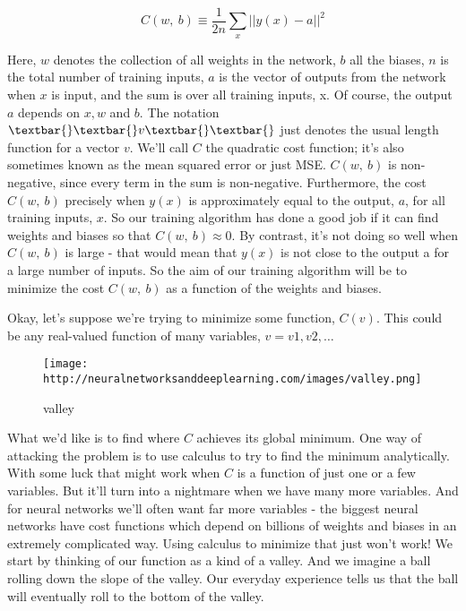 \documentclass[]{article}
\begin{document}
\begin{equation}
    C(w, \ b)\equiv\frac{1}{2n}\sum_x ||y(x) − a||^2
\end{equation}

Here, $ w $ denotes the collection of all weights in the network, $ b
$ all the biases, $ n $ is the total number of training inputs, $ a
$ is the vector of outputs from the network when $ x $ is input, and
the sum is over all training inputs, x. Of course, the output $ a $
depends on $ x, w $ and $ b $. The notation $
\textbar{}\textbar{}v\textbar{}\textbar{} $ just denotes the usual
length function for a vector $ v $. We'll call $ C $ the quadratic
cost function; it's also sometimes known as the mean squared error or
just MSE. $ C(w, ~b) $ is non-negative, since every term in the sum is
non-negative. Furthermore, the cost $ C(w, ~b) $ precisely when $
y(x) $ is approximately equal to the output, $ a
$, for all training inputs, $ x
$. So our training algorithm has done a good job if it can find weights and biases so that $
C(w, ~b) \approx 0 $. By contrast, it's not doing so well when $ C(w,
~b) $ is large - that would mean that $ y(x) $ is not close to the
output a for a large number of inputs. So the aim of our training
algorithm will be to minimize the cost $ C(w, ~b) $ as a function of
the weights and biases.

Okay, let's suppose we're trying to minimize some function, $ C(v)
$. This could be any real-valued function of many variables, $ v = v1,
v2, \ldots{} $

\begin{figure}[htbp]
\centering
\texttt{[image: http://neuralnetworksanddeeplearning.com/images/valley.png]}
\caption{valley}
\end{figure}

What we'd like is to find where $ C $ achieves its global minimum. One
way of attacking the problem is to use calculus to try to find the
minimum analytically. With some luck that might work when $ C $ is a
function of just one or a few variables. But it'll turn into a nightmare
when we have many more variables. And for neural networks we'll often
want far more variables - the biggest neural networks have cost
functions which depend on billions of weights and biases in an extremely
complicated way. Using calculus to minimize that just won't work! We
start by thinking of our function as a kind of a valley. And we imagine
a ball rolling down the slope of the valley. Our everyday experience
tells us that the ball will eventually roll to the bottom of the valley.
\end{document}
